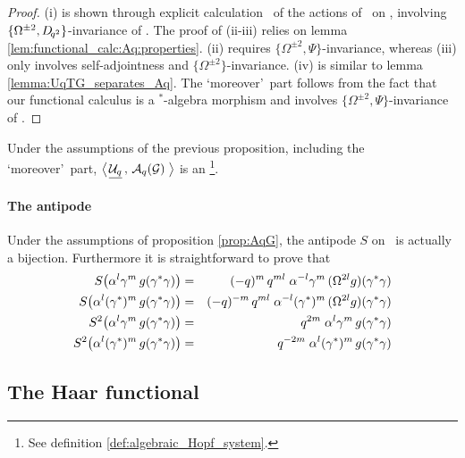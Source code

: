 \begin{proof}
(i) is shown through explicit calculation \cite{Koelink:thesis,Koelink:QE2}\ of the
actions of \Uq\ on \AqG, involving $\{\Omega^{\pm 2}, D_{\!q^2}\}$-invariance of \calG\@.
The proof of (ii-iii) relies on lemma \ref{lem:functional_calc:Aq:properties}\@.
(ii) requires $\{\Omega^{\pm 2},\Psi\}$-invariance, whereas (iii) only involves
self-adjointness and $\{\Omega^{\pm 2}\}$-invariance.
(iv) is similar to lemma \ref{lemma:UqTG_separates_Aq}\@.
The \lq moreover\rq\ part follows from the fact that our functional calculus is a
$^*$-algebra morphism and involves $\{\Omega^{\pm 2},\Psi\}$-invariance of \calG\@.
\end{proof}



\begin{cor} \label{cor:UqAqG:Hopf_system}
  Under the assumptions of the previous proposition, including the \lq moreover\rq\ part,
  $\left\langle\vertM\right. \! \underline{\Uq}\, , \, \AqG   \left.\vertM\right\rangle$
  is an \ahss\footnote{See definition \ref{def:algebraic_Hopf_system}.}\@.
\end{cor}



\paragraph{The antipode}
Under the assumptions of proposition \ref{prop:AqG}, the antipode\/ $S$ on\/ \AqG\
is actually a bijection. Furthermore it is straightforward to prove that
\begin{eqnarray*}
S \!\left(\alpha^l \gamma^m \,g(\gamma^*\gamma) \vertM \right) &=& (-q)^m \,
q^{ml} \; \alpha^{-l} \gamma^m \,(\Omega^{2l} g)(\gamma^*\gamma)
\\
S \!\left(\alpha^l (\gamma^*)^m \,g(\gamma^*\gamma) \vertM \right) &=& (-q)^{-m}
\, q^{ml} \; \alpha^{-l} (\gamma^*)^m \,(\Omega^{2l} g)(\gamma^*\gamma)
\\
S^2 \!\left(\alpha^l \gamma^m \,g(\gamma^*\gamma) \vertM \right) &=& q^{2m} \;
\alpha^l \gamma^m \,g(\gamma^*\gamma)
\\
S^2 \!\left(\alpha^l (\gamma^*)^m \,g(\gamma^*\gamma) \vertM \right) &=& q^{-2m}
\; \alpha^l (\gamma^*)^m \,g(\gamma^*\gamma)
\end{eqnarray*}


\subsection{The Haar functional}
\label{par:Haar:Aq:construction}

